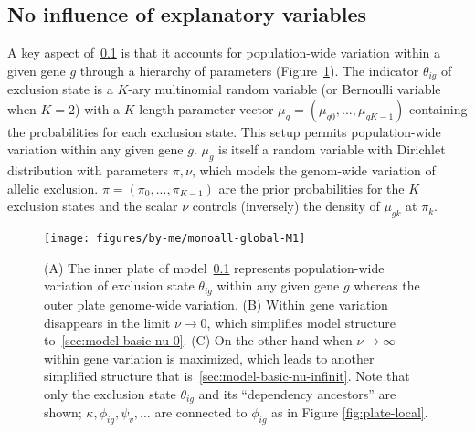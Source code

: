 \documentclass[letterpaper]{article}
\begin{document}
\renewcommand{\thesubsection}{M\arabic{model}}

\subsection{No influence of explanatory variables }
\label{sec:model-basic}

A key aspect of~\ref{sec:model-basic} is that it accounts for population-wide
variation within a given gene \(g\) through a hierarchy of parameters
(Figure~\ref{fig:plate-basic}).  The indicator \(\theta_{ig}\) of exclusion
state is a \(K\)-ary multinomial random variable (or Bernoulli variable when
\(K=2\)) with a \(K\)-length parameter vector
\(\mu_g=(\mu_{g0},...,\mu_{gK-1})\) containing the probabilities for each
exclusion state.  This setup permits population-wide variation within any
given gene \(g\).  \(\mu_g\) is itself a random variable with Dirichlet
distribution with parameters \(\pi,\nu\), which models the genom-wide
variation of allelic exclusion.  \(\pi=(\pi_0,...,\pi_{K-1})\) are the prior
probabilities for the \(K\) exclusion states and the scalar \(\nu\) controls
(inversely) the density of \(\mu_{gk}\) at \(\pi_k\).

\begin{figure}[t]
\begin{center}
\texttt{[image: figures/by-me/monoall-global-M1]}
\end{center}
\caption{
(A) The inner plate of model~\ref{sec:model-basic} represents
population-wide variation of exclusion state \(\theta_{ig}\) within any given
gene \(g\) whereas the outer plate genome-wide variation.  (B) Within gene
variation disappears in the limit \(\nu\rightarrow 0\), which simplifies model
structure to~\ref{sec:model-basic-nu-0}. (C) On the other hand  when
\(\nu\rightarrow\infty\) within gene variation is maximized, which leads to
another simplified structure that is~\ref{sec:model-basic-nu-infinit}.  Note
that only the exclusion state \(\theta_{ig}\) and its ``dependency ancestors''
are shown; \(\kappa, \phi_{ig}, \psi_v,...\) are connected to \(\phi_{ig}\) as
in Figure \ref{fig:plate-local}.
}
\label{fig:plate-basic}
\end{figure}
\end{document}
